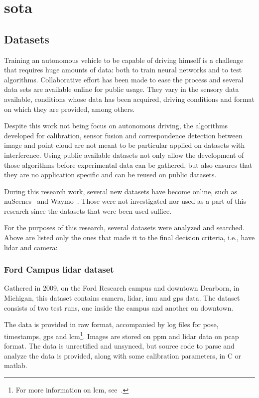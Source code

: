 \chapter{\acl{sota}}
\label{chapter:sota}

\section{Datasets}
\label{section:sota:datasets}

Training an autonomous vehicle to be capable of driving himself is a challenge that requires huge amounts of data: both to train neural networks and to test algorithms. Collaborative effort has been made to ease the process and several data sets are available online for public usage. They vary in the sensory data available, conditions whose data has been acquired, driving conditions and format on which they are provided, among others. 

Despite this work not being focus on autonomous driving, the algorithms developed for calibration, sensor fusion and correspondence detection between image and point cloud are not meant to be particular applied on datasets with interference. Using public available datasets not only allow the development of those algorithms before experimental data can be gathered, but also ensures that they are no application specific and can be reused on public datasets.

During this research work, several new datasets have become online, such as
nuScenes~\cite{nuScenes2019} and Waymo~\cite{Waymo}. Those were not investigated nor used as a part
of this research since the datasets that were been used suffice.

For the purposes of this research, several datasets were analyzed and searched. Above are listed only the ones that made it to the final decision criteria, i.e., have \ac{lidar} and camera:

\subsection{Ford Campus \ac{lidar} dataset}
Gathered in 2009, on the Ford Research campus and downtown Dearborn, in Michigan, this dataset contains camera, \ac{lidar}, \ac{imu} and \ac{gps} data. The dataset consists of two test runs, one inside the campus and another on downtown. 

The data is provided in raw format, accompanied by log files for pose, timestamps, \ac{gps} and \ac{lcm}\footnote{For more information on \acf{lcm}, see~\cite{Wang2018a}.}. Images are stored on \ac{ppm} and \ac{lidar} data on \ac{pcap} format. The data is unrectified and unsynced, but source code to parse and analyze the data is provided, along with some calibration parameters, in C or \ac{matlab}.

